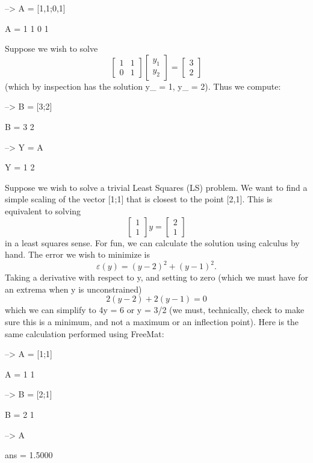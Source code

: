 {\ttfamily 
\begin{DoxyVerbInclude}
--> A = [1,1;0,1]

A = 
 1 1 
 0 1 
\end{DoxyVerbInclude}
}

{\ttfamily Suppose we wish to solve \[ \begin{bmatrix} 1 & 1 \\ 0 & 1 \end{bmatrix} \begin{bmatrix} y_1 \\ y_2 \end{bmatrix} = \begin{bmatrix} 3 \\ 2 \end{bmatrix} \] (which by inspection has the solution {\ttfamily y\-\_ = 1}, {\ttfamily y\-\_ = 2}). Thus we compute\-:}

{\ttfamily 
\begin{DoxyVerbInclude}
--> B = [3;2]

B = 
 3 
 2 

--> Y = A\B

Y = 
 1 
 2 
\end{DoxyVerbInclude}
}

{\ttfamily Suppose we wish to solve a trivial Least Squares (L\-S) problem. We want to find a simple scaling of the vector {\ttfamily \mbox{[}1;1\mbox{]}} that is closest to the point {\ttfamily \mbox{[}2,1\mbox{]}}. This is equivalent to solving \[ \begin{bmatrix} 1 \\ 1 \end{bmatrix} y = \begin{bmatrix} 2 \\ 1 \end{bmatrix} \] in a least squares sense. For fun, we can calculate the solution using calculus by hand. The error we wish to minimize is \[ \varepsilon(y) = (y - 2)^2 + (y-1)^2. \] Taking a derivative with respect to {\ttfamily y}, and setting to zero (which we must have for an extrema when {\ttfamily y} is unconstrained) \[ 2 (y-2) + 2 (y-1) = 0 \] which we can simplify to {\ttfamily 4y = 6} or {\ttfamily y = 3/2} (we must, technically, check to make sure this is a minimum, and not a maximum or an inflection point). Here is the same calculation performed using Free\-Mat\-:}

{\ttfamily 
\begin{DoxyVerbInclude}
--> A = [1;1]

A = 
 1 
 1 

--> B = [2;1]

B = 
 2 
 1 

--> A\B

ans = 
    1.5000 
\end{DoxyVerbInclude}
}

